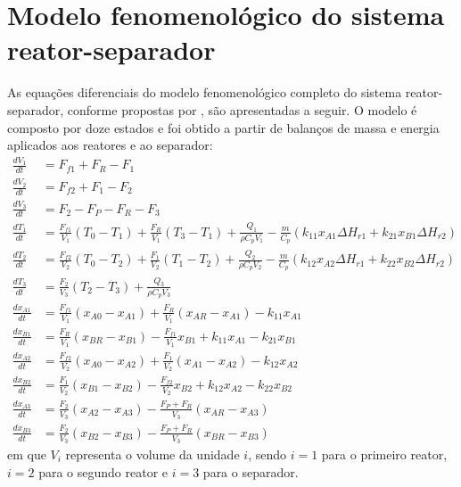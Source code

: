 \appendix

\appendixpage
\addappheadtotoc

\section{Modelo fenomenológico do sistema reator-separador}
\label{sec:apendice_modelo}

As equações diferenciais do modelo fenomenológico completo do sistema reator-separador, conforme propostas por \textcite{pourkargar_2017}, são apresentadas a seguir.
O modelo é composto por doze estados e foi obtido a partir de balanços de massa e energia aplicados aos reatores e ao separador:
\begin{align}
  \frac{dV_1}{dt} &= F_{f1} + F_R - F_1 \\
  \frac{dV_2}{dt} &= F_{f2} + F_1 - F_2 \\
  \frac{dV_3}{dt} &= F_2 - F_P - F_R - F_3 \\
  \frac{dT_1}{dt} &= \frac{F_{f1}}{V_1}(T_0 - T_1) + \frac{F_R}{V_1}(T_3 - T_1) + \frac{Q_1}{\rho C_p V_1} - \frac{m}{C_p}(k_{11} x_{A1} \Delta H_{r1} + k_{21} x_{B1} \Delta H_{r2}) \\
  \frac{dT_2}{dt} &= \frac{F_{f2}}{V_2}(T_0 - T_2) + \frac{F_1}{V_2}(T_1 - T_2) + \frac{Q_2}{\rho C_p V_2} - \frac{m}{C_p}(k_{12} x_{A2} \Delta H_{r1} + k_{22} x_{B2} \Delta H_{r2}) \\
  \frac{dT_3}{dt} &= \frac{F_2}{V_3}(T_2 - T_3) + \frac{Q_3}{\rho C_p V_3} \\
  \frac{dx_{A1}}{dt} &= \frac{F_{f1}}{V_1}(x_{A0} - x_{A1}) + \frac{F_R}{V_1}(x_{AR} - x_{A1}) - k_{11} x_{A1} \\
  \frac{dx_{B1}}{dt} &= \frac{F_R}{V_1}(x_{BR} - x_{B1}) - \frac{F_{f1}}{V_1} x_{B1} + k_{11} x_{A1} - k_{21} x_{B1} \\
  \frac{dx_{A2}}{dt} &= \frac{F_{f2}}{V_2}(x_{A0} - x_{A2}) + \frac{F_1}{V_2}(x_{A1} - x_{A2}) - k_{12} x_{A2} \\
  \frac{dx_{B2}}{dt} &= \frac{F_1}{V_2}(x_{B1} - x_{B2}) - \frac{F_{f2}}{V_2} x_{B2} + k_{12} x_{A2} - k_{22} x_{B2} \\
  \frac{dx_{A3}}{dt} &= \frac{F_2}{V_3}(x_{A2} - x_{A3}) - \frac{F_P + F_R}{V_3}(x_{AR} - x_{A3}) \\
  \frac{dx_{B3}}{dt} &= \frac{F_2}{V_3}(x_{B2} - x_{B3}) - \frac{F_P + F_R}{V_3}(x_{BR} - x_{B3})
\end{align}
em que $V_i$ representa o volume da unidade $i$, sendo $i=1$ para o primeiro reator, $i=2$ para o segundo reator e $i=3$ para o separador.
